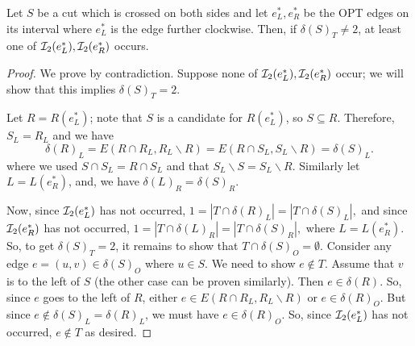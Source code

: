 \begin{lemma}\label{lem:xed-both-sides-one-increases} Let $S$ be a cut which is crossed on both sides and let $e^*_L,e^*_R$ be the OPT edges on its interval where $e^*_L$ is the edge further clockwise. Then, if $\delta(S)_T \not=2$, at least one of ${\cal I}_2(e^*_L),{\cal I}_2(e^*_R)$  occurs.
\end{lemma}
\begin{proof}
We prove by contradiction. Suppose none of ${\cal I}_2(e^*_L),{\cal I}_2(e^*_R)$ occur; we will show that this implies $\delta(S)_T = 2$. 

Let $R=R(e^*_L)$; note that $S$ is a candidate for $R(e^*_L)$, so $S\subseteq R$. Therefore, $S_L = R_L$ and we have
$$\delta(R)_L = E(R \cap R_L, R_L \smallsetminus R) = E(R \cap S_L, S_L \smallsetminus R) = \delta(S)_L.$$
where we used $S\cap S_L=R\cap S_L$ and that $S_L \smallsetminus S = S_L \smallsetminus R$.
Similarly let $L=L(e^*_R)$, and, we have $\delta(L)_R=\delta(S)_R$.

Now, since ${\cal I}_2(e^*_L)$ has not occurred,
$1 = |T\cap \delta(R)_L| =|T\cap \delta(S)_L|,$
and since ${\cal I}_2(e^*_R)$ has not occurred,
$1 = |T\cap \delta(L)_R|= |T\cap \delta(S)_R|,$
where  $L = L(e_R^*)$.
So, to get $\delta(S)_T=2$, it remains to show that  $T\cap \delta(S)_O = \emptyset$.
Consider any edge $e=(u,v)\in \delta(S)_O$ where  $u \in S$. We need to show $e\notin T$. Assume that $v$ is to the left of $S$ (the other case can be proven similarly). 
Then $e \in \delta(R)$. So, since $e$ goes to the left of $R$, either $e \in E(R \cap R_L, R_L \smallsetminus R)$ or $e \in \delta(R)_O$. But since $e\notin \delta(S)_L = \delta(R)_L$, we must have $e\in \delta(R)_O$. So, since ${\cal I}_2(e^*_L)$ has not occurred, $e\notin T$ as desired.
%
\end{proof}

